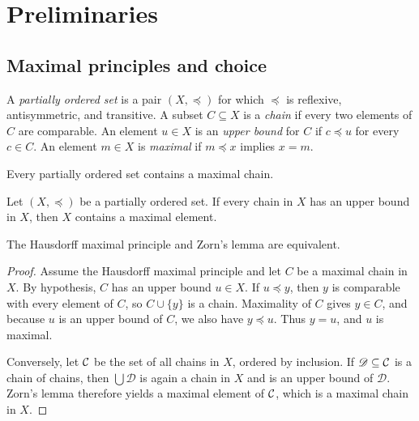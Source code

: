 \chapter{Preliminaries}

\section{Maximal principles and choice}

\begin{de}
A \emph{partially ordered set} is a pair $(X,\preccurlyeq)$ for which $\preccurlyeq$ is reflexive, antisymmetric, and transitive. A subset $C\subseteq X$ is a \emph{chain} if every two elements of $C$ are comparable. An element $u\in X$ is an \emph{upper bound} for $C$ if $c\preccurlyeq u$ for every $c\in C$. An element $m\in X$ is \emph{maximal} if $m\preccurlyeq x$ implies $x=m$.
\end{de}

\begin{thm}
Every partially ordered set contains a maximal chain.
\end{thm}

\begin{thm}
Let $(X,\preccurlyeq)$ be a partially ordered set. If every chain in $X$ has an upper bound in $X$, then $X$ contains a maximal element.
\end{thm}

\begin{prop}
The Hausdorff maximal principle and Zorn's lemma are equivalent.
\end{prop}

\begin{proof}
Assume the Hausdorff maximal principle and let $C$ be a maximal chain in $X$. By hypothesis, $C$ has an upper bound $u\in X$. If $u\preccurlyeq y$, then $y$ is comparable with every element of $C$, so $C\cup\{y\}$ is a chain. Maximality of $C$ gives $y\in C$, and because $u$ is an upper bound of $C$, we also have $y\preccurlyeq u$. Thus $y=u$, and $u$ is maximal.

Conversely, let $\mathcal{C}$ be the set of all chains in $X$, ordered by inclusion. If $\mathscr D\subseteq\mathcal{C}$ is a chain of chains, then $\bigcup\mathscr D$ is again a chain in $X$ and is an upper bound of $\mathscr D$. Zorn's lemma therefore yields a maximal element of $\mathcal{C}$, which is a maximal chain in $X$.
\end{proof}

